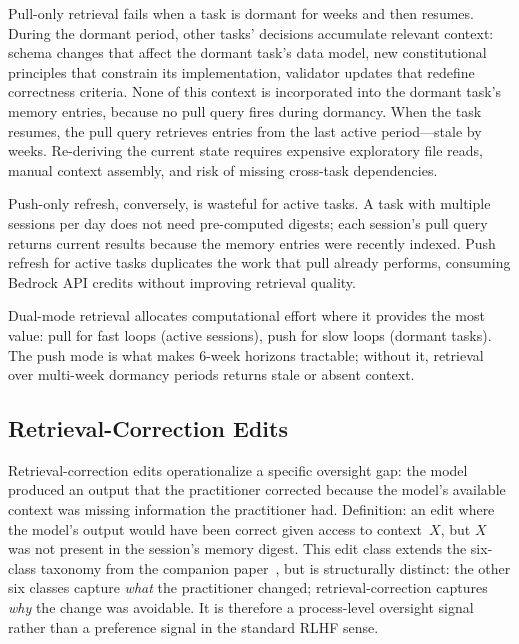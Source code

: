 \documentclass[11pt]{article}
\begin{document}
Pull-only retrieval fails when a task is dormant for weeks and then resumes.
During the dormant period, other tasks' decisions accumulate relevant context: schema changes that affect the dormant task's data model, new constitutional principles that constrain its implementation, validator updates that redefine correctness criteria.
None of this context is incorporated into the dormant task's memory entries, because no pull query fires during dormancy.
When the task resumes, the pull query retrieves entries from the last active period---stale by weeks.
Re-deriving the current state requires expensive exploratory file reads, manual context assembly, and risk of missing cross-task dependencies.

Push-only refresh, conversely, is wasteful for active tasks.
A task with multiple sessions per day does not need pre-computed digests; each session's pull query returns current results because the memory entries were recently indexed.
Push refresh for active tasks duplicates the work that pull already performs, consuming Bedrock API credits without improving retrieval quality.

Dual-mode retrieval allocates computational effort where it provides the most value: pull for fast loops (active sessions), push for slow loops (dormant tasks).
The push mode is what makes 6-week horizons tractable; without it, retrieval over multi-week dormancy periods returns stale or absent context.

\subsection{Retrieval-Correction Edits}
\label{sec:retrieval-correction}

Retrieval-correction edits operationalize a specific oversight gap: the model produced an output that the practitioner corrected because the model's available context was missing information the practitioner had.
Definition: an edit where the model's output would have been correct given access to context~$X$, but $X$ was not present in the session's memory digest.
This edit class extends the six-class taxonomy from the companion paper~\citep[\S4]{ovcharov2026recursive}, but is structurally distinct: the other six classes capture \emph{what} the practitioner changed; retrieval-correction captures \emph{why} the change was avoidable.
It is therefore a process-level oversight signal rather than a preference signal in the standard RLHF sense.
\end{document}
